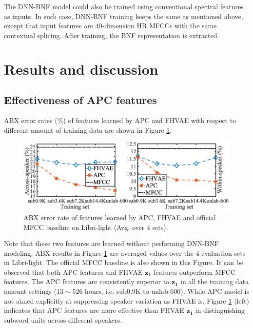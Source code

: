 \documentclass[a4paper]{article}
\begin{document}
The DNN-BNF model could also be trained using conventional spectral features as inputs. 
In such case, DNN-BNF training keeps the same as mentioned above, except that input features are $40$-dimension HR MFCCs with the same contextual splicing. After training, the BNF representation is   extracted.

\section{Results and discussion}
\subsection{Effectiveness of APC features }

ABX error rates ($\%$) of features learned by APC and FHVAE with respect to different amount of training data are shown in Figure \ref{fig:apc_fhvae_mfcc}.
\begin{figure}[!t]
    \centering
    \includegraphics[width=\linewidth]{apc_fhvae_mfcc.png}
    \caption{ABX error rate  of features learned by APC, FHVAE and official MFCC baseline on Libri-light (Avg. over $4$ sets). }
    \label{fig:apc_fhvae_mfcc}
\end{figure}
Note that these two features are learned without performing DNN-BNF modeling. ABX results in  Figure \ref{fig:apc_fhvae_mfcc} are averaged values over the $4$ evaluation sets in Libri-light. The official MFCC baseline   \cite{kahn2019librilight} is also shown in this Figure. It can be observed that both APC features and FHVAE $\bm{z_1}$ features outperform MFCC features. The APC features are consistently superior to $\bm{z_1}$ in all the training data amount settings ($13 \sim 526$ hours, i.e. sub0.9K to unlab-600). 
While APC model is not aimed explicitly at suppressing speaker variation as FHVAE is,   
Figure \ref{fig:apc_fhvae_mfcc} (left) indicates that APC features are more effective than FHVAE $\bm{z_1}$ in distinguishing subword units across different speakers.
\end{document}

